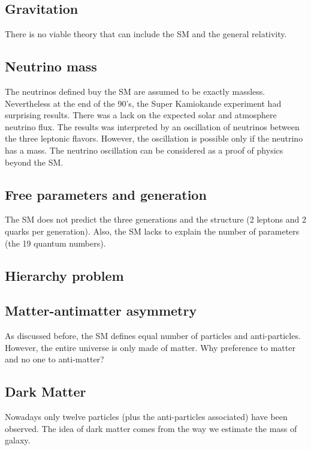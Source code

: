     \subsection{Gravitation}
    There is no viable theory that can include the SM and the general relativity.

    \subsection{Neutrino mass}

    The neutrinos defined buy the SM are assumed to be exactly massless.
    Nevertheless at the end of the 90's, the Super Kamiokande experiment had surprising results.
    There was a lack on the expected solar and atmosphere neutrino flux. 
    The results was interpreted by an oscillation of neutrinos between the three leptonic flavors.
    However, the oscillation is possible only if the neutrino has a mass.
    The neutrino oscillation can be considered as a proof of physics beyond the SM.

    \subsection{Free parameters and generation}

    The SM does not predict the three generations and the structure (2 leptons and 2 quarks per generation). 
    Also, the SM lacks to explain the number of parameters (the 19 quantum numbers).

    \subsection{Hierarchy problem}

    \subsection{Matter-antimatter asymmetry}

    As discussed before, the SM defines equal number of particles and anti-particles. 
    However, the entire universe is only made of matter. 
    Why preference to matter and no one to anti-matter? 

    \subsection{Dark Matter}
    
    Nowadays only twelve particles (plus the anti-particles associated) have been observed. 
    The idea of dark matter comes from the way we estimate the mass of galaxy.

